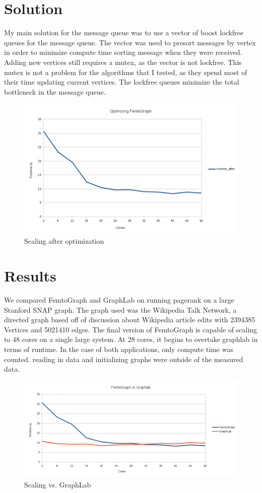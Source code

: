\documentclass{sig-alternate-05-2015}
\begin{document}
\section{Solution}
\justify
My main solution for the message queue was to use a vector of boost lockfree queues for the message queue. The vector was used to presort messages by vertex in order to minimize compute time sorting message when they were received. Adding new vertices still requires a mutex, as the vector is not lockfree. This mutex is not a problem for the algorithms that I tested, as they spend most of their time updating current vertices. The lockfree queues minimize the total bottleneck in the message queue.
\begin{figure}
  \centering
  \includegraphics[width=\columnwidth]{after.png}
  \caption{Scaling after optimization}
\end{figure}



\section{Results}
\justify
We compared FemtoGraph and  GraphLab on running pagerank on a large Stanford SNAP graph. The graph used was the Wikipedia Talk Network, a directed graph based off of discussion about Wikipedia article edits with 2394385 Vertices and 5021410 edges. \cite{snapnets} The final version of FemtoGraph is capable of scaling to 48 cores on a single large system. At 28 cores, it begins to overtake graphlab in terms of runtime. In the case of both applications, only compute time was counted. reading in data and initializing graphs were outside of the measured data. 
\begin{figure}
  \centering
  \includegraphics[width=\columnwidth]{vs.png}
  \caption{Scaling vs. GraphLab}
\end{figure}
\end{document}

